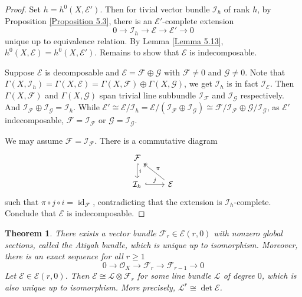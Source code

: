 \documentclass{ctexart}
\newtheorem{theorem}{Theorem}[section]
\newcommand{\identity}{\operatorname{id}}
\begin{document}
\begin{proof}
    Set $h = h^{0}(X, \mathcal{E}')$.
    Then for tivial vector bundle $\mathcal{I}_{h}$ of rank $h$,
    by Proposition \ref{Proposition 5.3}, there is an $\mathcal{E}'$-complete extension 
    \begin{equation}
        0 \longrightarrow \mathcal{I}_{h} \longrightarrow \mathcal{E} \longrightarrow \mathcal{E}' \longrightarrow 0
    \end{equation}
    unique up to equivalence relation.
    By Lemma \ref{Lemma 5.13}, $h^{0}(X, \mathcal{E}) = h^{0}(X, \mathcal{E}')$.
    Remains to show that $\mathcal{E}$ is indecomposable.
    \par
    Suppose $\mathcal{E}$ is decomposable and $\mathcal{E} = \mathcal{F} \oplus \mathcal{G}$ with $\mathcal{F} \neq 0$ and $\mathcal{G} \neq 0$.
    Note that $\Gamma(X, \mathcal{I}_{h}) = \Gamma(X, \mathcal{E}) = \Gamma(X, \mathcal{F}) \oplus \Gamma(X, \mathcal{G})$, we get $\mathcal{I}_{h}$ is in fact $\mathcal{I}_{\mathcal{E}}$.
    Then $\Gamma(X, \mathcal{F})$ and $\Gamma(X, \mathcal{G})$ span trivial line subbundle $\mathcal{I}_{\mathcal{F}}$ and $\mathcal{I}_{\mathcal{G}}$ respectively.
    And $\mathcal{I}_{\mathcal{F}} \oplus \mathcal{I}_{\mathcal{G}} = \mathcal{I}_{h}$.
    While $\mathcal{E}' \cong \mathcal{E}/\mathcal{I}_{h} = \mathcal{E}/(\mathcal{I}_{\mathcal{F}} \oplus \mathcal{I}_{\mathcal{G}}) \cong \mathcal{F}/\mathcal{I}_{\mathcal{F}} \oplus \mathcal{G}/\mathcal{I}_{\mathcal{G}}$, 
    as $\mathcal{E}'$ indecomposable, $\mathcal{F} = \mathcal{I}_{\mathcal{F}}$ or $\mathcal{G} = \mathcal{I}_{\mathcal{G}}$.
    \par
    We may assume $\mathcal{F} = \mathcal{I}_{\mathcal{F}}$.
    There is a commutative diagram
    \begin{equation}
        \begin{tikzcd}
            \mathcal{F} \arrow[d, hookrightarrow, "i"] & \\
            \mathcal{I}_{h} \arrow[r, hookrightarrow, "j"] &
            \mathcal{E} \arrow[ul, twoheadrightarrow, "\pi" swap]
        \end{tikzcd}
    \end{equation}
    such that $\pi \circ j \circ i = \identity_{\mathcal{F}}$, contradicting that the extension is $\mathcal{I}_{h}$-complete.
    Conclude that $\mathcal{E}$ is indecomposable.
\end{proof}
\begin{theorem}
    There exists a vector bundle $\mathcal{F}_{r}\in \mathcal{E}(r, 0)$ with nonzero global sections, called the Atiyah bundle,
    which is unique up to isomorphism.
    Moreover, there is an exact sequence for all $r \ge 1$
    \begin{equation}
        0 \longrightarrow \mathcal{O}_{X} \longrightarrow \mathcal{F}_{r} \longrightarrow \mathcal{F}_{r - 1} \longrightarrow 0
    \end{equation}
    Let $\mathcal{E}\in \mathcal{E}(r, 0)$.
    Then $\mathcal{E} \cong \mathcal{L} \otimes \mathcal{F}_{r}$ for some line bundle $\mathcal{L}$ of degree $0$,
    which is also unique up to isomorphism.
    More precisely, $\mathcal{L}^{r} \cong \det \mathcal{E}$.
    \label{Theorem 5.2}
\end{theorem}
\end{document}
